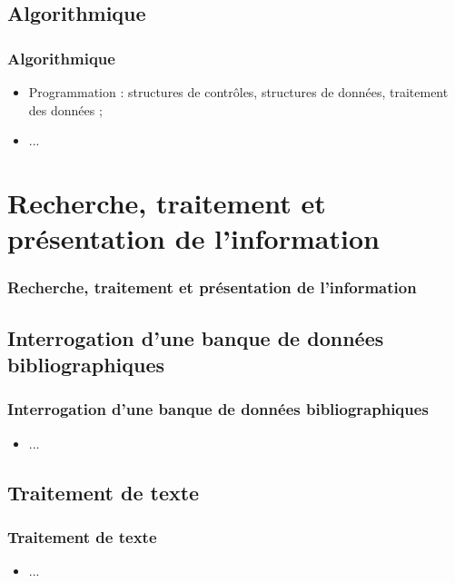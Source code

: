 \documentclass{beamer}
\begin{document}
\def\titleSection1Subsection5{Algorithmique}
\subsection{ \titleSection1Subsection5 }
\begin{frame}
	\frametitle{ \titleSection1Subsection5 }
	\begin{itemize}
		\item Programmation : structures de contr{\^o}les, structures de donn{\'e}es, traitement des donn{\'e}es ; 
		\item ... 
	\end{itemize}
\end{frame}


\def\titleSection2{Recherche, traitement et pr{\'e}sentation de l'information}
\section{ \titleSection2 }
\begin{frame}
	\frametitle{ \titleSection2 }
	\tableofcontents[sections=3,currentsection,subsectionstyle=show/shaded/hide]
\end{frame} 

\def\titleSection2SubsectionI{Interrogation d'une banque de donn{\'e}es bibliographiques}
\subsection{ \titleSection2SubsectionI }
\begin{frame}
	\frametitle{ \titleSection2SubsectionI }
	\begin{itemize}
		\item ... 
	\end{itemize}
\end{frame}

\def\titleSection2Subsection2{Traitement de texte}
\subsection{ \titleSection2Subsection2 }
\begin{frame}
	\frametitle{ \titleSection2Subsection2 }
	\begin{itemize}
		\item ... 
	\end{itemize}
\end{frame}
\end{document}
